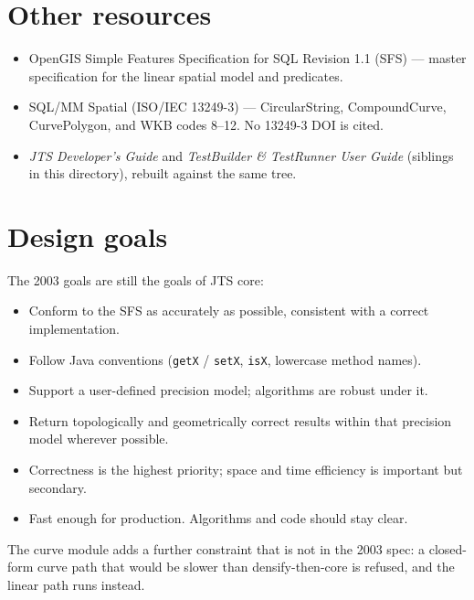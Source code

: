 \documentclass[11pt]{article}
\begin{document}
\section{Other resources}
\begin{itemize}
  \item OpenGIS Simple Features Specification for SQL Revision 1.1
        (SFS) --- master specification for the linear spatial model
        and predicates.
  \item SQL/MM Spatial (ISO/IEC 13249-3) --- CircularString,
        CompoundCurve, CurvePolygon, and WKB codes 8--12. No
        13249-3 DOI is cited.
  \item \emph{JTS Developer's Guide} and \emph{TestBuilder \&
        TestRunner User Guide} (siblings in this directory), rebuilt
        against the same tree.
\end{itemize}

\section{Design goals}
The 2003 goals are still the goals of JTS core:
\begin{itemize}
  \item Conform to the SFS as accurately as possible, consistent with
        a correct implementation.
  \item Follow Java conventions (\texttt{getX} / \texttt{setX},
        \texttt{isX}, lowercase method names).
  \item Support a user-defined precision model; algorithms are robust
        under it.
  \item Return topologically and geometrically correct results within
        that precision model wherever possible.
  \item Correctness is the highest priority; space and time
        efficiency is important but secondary.
  \item Fast enough for production. Algorithms and code should stay
        clear.
\end{itemize}

The curve module adds a further constraint that is not in the 2003
spec: a closed-form curve path that would be slower than
densify-then-core is refused, and the linear path runs instead.
\end{document}
